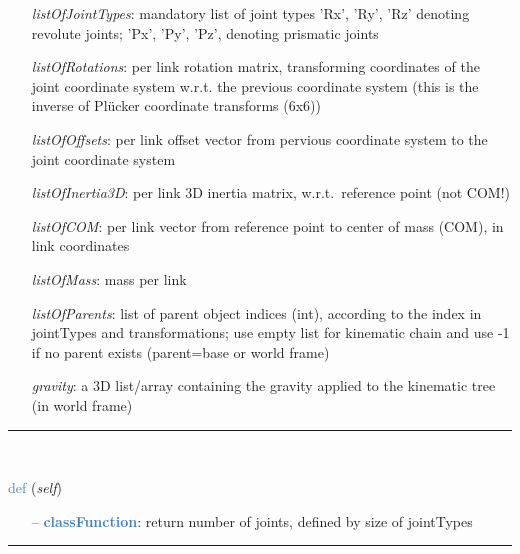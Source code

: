 \begin{itemize}[leftmargin=1.4cm]
\begin{itemize}[leftmargin=0.5cm]
\begin{itemize}[leftmargin=1.4cm]
\begin{itemize}[leftmargin=0.5cm]
\begin{itemize}[leftmargin=1.4cm]
\begin{itemize}[leftmargin=0.5cm]
\begin{itemize}[leftmargin=1.4cm]
\begin{itemize}[leftmargin=1.4cm]
\begin{itemize}[leftmargin=1.4cm]
\begin{itemize}[leftmargin=0.7cm]
  \begin{itemize}[leftmargin=1.2cm]
\setlength{\itemindent}{-0.7cm}
    \item[] {\it listOfJointTypes}: mandatory list of joint types 'Rx', 'Ry', 'Rz' denoting revolute joints; 'Px', 'Py', 'Pz', denoting prismatic joints
    \item[] {\it   listOfRotations}: per link rotation matrix, transforming coordinates of the joint coordinate system w.r.t. the previous coordinate system (this is the inverse of Pl\"ucker coordinate transforms (6x6))
    \item[] {\it   listOfOffsets}: per link offset vector from pervious coordinate system to the joint coordinate system
    \item[] {\it   listOfInertia3D}: per link 3D inertia matrix, w.r.t.\ reference point (not COM!)
    \item[] {\it   listOfCOM}: per link vector from reference point to center of mass (COM), in link coordinates
    \item[] {\it   listOfMass}: mass per link
    \item[] {\it   listOfParents}: list of parent object indices (int), according to the index in jointTypes and transformations; use empty list for kinematic chain and use -1 if no parent exists (parent=base or world frame)
    \item[] {\it   gravity}: a 3D list/array containing the gravity applied to the kinematic tree (in world frame)
  \end{itemize}
\vspace{12pt}\end{itemize}
%
\noindent\rule{8cm}{0.75pt}\vspace{1pt} \\ 
\begin{flushleft}
\noindent \textcolor{steelblue}{def {\bf {}}}\label{sec:kinematicTree:KinematicTree:Size}
({\it self})
\end{flushleft}
\setlength{\itemindent}{0.7cm}
\begin{itemize}[leftmargin=0.7cm]
  \item[--]  \textcolor{steelblue}{\bf classFunction}: return number of joints, defined by size of jointTypes\vspace{12pt}\end{itemize}
%
\noindent\rule{8cm}{0.75pt}\vspace{1pt} \\ 

\end{itemize}
\end{itemize}
\end{itemize}
\end{itemize}
\end{itemize}
\end{itemize}
\end{itemize}
\end{itemize}
\end{itemize}
